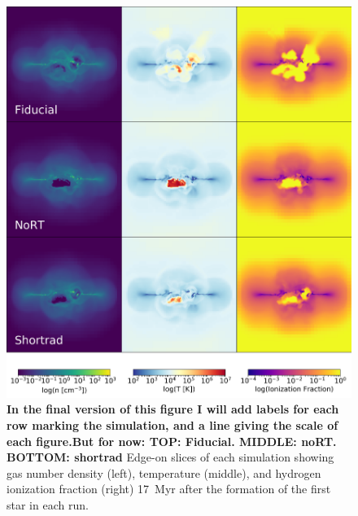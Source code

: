 \documentclass[twocolumn]{aastex62}
\begin{document}
\begin{figure}
\centering
\includegraphics[width=0.99\linewidth]{DD0136_fiducial_shortrad_nort}
\caption{\textbf{In the final version of this figure I will add labels for each row marking the simulation, and a line giving the scale of each figure.But for now: TOP: Fiducial. MIDDLE: noRT. BOTTOM: shortrad} Edge-on slices of each simulation showing gas number density (left), temperature (middle), and hydrogen ionization fraction (right) 17~Myr after the formation of the first star in each run.}
\label{fig:panel1}
\end{figure}
\end{document}
